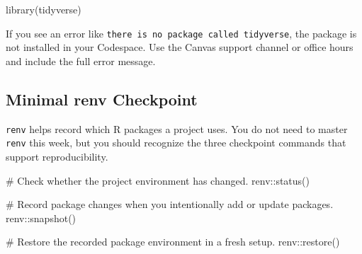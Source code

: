 \documentclass[
  letterpaper,
  DIV=11,
  numbers=noendperiod,
  oneside]{scrreprt}
\newenvironment{Shaded}{\begin{snugshade}}{\end{snugshade}}
\newcommand{\CommentTok}[1]{\textcolor[rgb]{0.37,0.37,0.37}{#1}}
\newcommand{\FunctionTok}[1]{\textcolor[rgb]{0.28,0.35,0.67}{#1}}
\newcommand{\NormalTok}[1]{\textcolor[rgb]{0.00,0.23,0.31}{#1}}
\newcommand{\SpecialCharTok}[1]{\textcolor[rgb]{0.37,0.37,0.37}{#1}}
\begin{document}
\begin{Shaded}
\begin{Highlighting}[numbers=left,,]
\FunctionTok{library}\NormalTok{(tidyverse)}
\end{Highlighting}
\end{Shaded}

\begin{tcolorbox}[enhanced jigsaw, opacitybacktitle=0.6, colbacktitle=quarto-callout-note-color!10!white, breakable, opacityback=0, coltitle=black, toptitle=1mm, bottomrule=.15mm, colframe=quarto-callout-note-color-frame, bottomtitle=1mm, colback=white, leftrule=.75mm, rightrule=.15mm, title=\textcolor{quarto-callout-note-color}{\faInfo}\hspace{0.5em}{Note}, left=2mm, arc=.35mm, toprule=.15mm, titlerule=0mm]

If you see an error like
\texttt{there\ is\ no\ package\ called\ \textquotesingle{}tidyverse\textquotesingle{}},
the package is not installed in your Codespace. Use the Canvas support
channel or office hours and include the full error message.

\end{tcolorbox}

\subsection*{Minimal renv Checkpoint}\label{minimal-renv-checkpoint}

\texttt{renv} helps record which R packages a project uses. You do not
need to master \texttt{renv} this week, but you should recognize the
three checkpoint commands that support reproducibility.

\begin{Shaded}
\begin{Highlighting}[numbers=left,,]
\CommentTok{\# Check whether the project environment has changed.}
\NormalTok{renv}\SpecialCharTok{::}\FunctionTok{status}\NormalTok{()}

\CommentTok{\# Record package changes when you intentionally add or update packages.}
\NormalTok{renv}\SpecialCharTok{::}\FunctionTok{snapshot}\NormalTok{()}

\CommentTok{\# Restore the recorded package environment in a fresh setup.}
\NormalTok{renv}\SpecialCharTok{::}\FunctionTok{restore}\NormalTok{()}
\end{Highlighting}
\end{Shaded}
\end{document}
